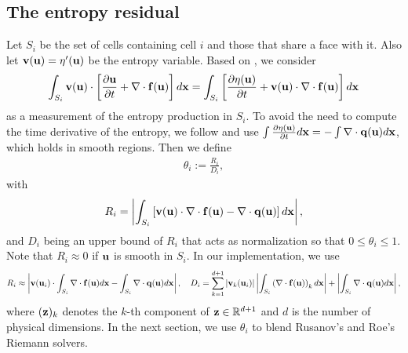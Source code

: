 \documentclass[preprint, 11pt]{article}
\newcommand{\bff}{{\bf f}}
\newcommand{\bfu}{{\bf u}}
\newcommand{\bfv}{{\bf v}}
\newcommand{\bfq}{{\bf q}}
\newcommand{\bfx}{{\bf x}}
\begin{document}
\subsection{The entropy residual}
Let $S_i$ be the set of cells containing cell $i$ and those that share a face with it.
Also let $\bfv(\bfu)=\eta^\prime(\bfu)$ be the entropy variable.
Based on \cite{guermond2011entropy}, we consider
\begin{align}\label{ent_residual}
  \int_{S_i} \bfv(\bfu) \cdot \left[ \frac{\partial \bfu}{\partial t} + \nabla\cdot \bff(\bfu)\right]d\bfx
  =\int_{S_i} \left[\frac{\partial \eta(\bfu)}{\partial t} + \bfv(\bfu) \cdot \nabla\cdot \bff(\bfu)\right] d\bfx
\end{align}
as a measurement of the entropy production in $S_i$.
To avoid the need to compute the time derivative of the entropy, we follow
\cite{guermond2018second, guermond2018well} and use
$\int \frac{\partial\eta(\bfu)}{\partial t}d\bfx=-\int \nabla\cdot\bfq(\bfu) d\bfx$,
which holds in smooth regions. Then we define
\begin{align}\label{Ri}
  \theta_i := \frac{R_i}{D_i},
\end{align}
with
\begin{align*}
  R_i=
  \left|\int_{S_i} \left[\bfv(\bfu) \cdot \nabla\cdot \bff(\bfu) - \nabla\cdot\bfq(\bfu) \right] d\bfx\right|,
\end{align*}
and $D_i$ being an upper bound of $R_i$ that acts as normalization so that $0\leq \theta_i\leq 1$.
Note that $R_i\approx 0$ if $\bfu$ is smooth in $S_i$.
In our implementation, we use
\begin{align*}
  R_i\approx \left|\bfv(\bfu_i)\cdot \int_{S_i}\nabla\cdot \bff(\bfu)d\bfx
  -\int_{S_i}\nabla\cdot\bfq(\bfu) d\bfx\right|,
  \quad
  D_i = \sum_{k=1}^{d+1}|\bfv_k(\bfu_i)|\left|\int_{S_i}\left(\nabla\cdot\bff(\bfu)\right)_kd\bfx\right|
  +\left|\int_{S_i}\nabla\cdot\bfq(\bfu)d\bfx\right|,
\end{align*}
where $({\bf z})_k$ denotes the $k$-th component of ${\bf z}\in\mathbb{R}^{d+1}$ and $d$ is the number of physical
dimensions. In the next section, we use $\theta_i$ to blend Rusanov's and Roe's Riemann solvers.
\end{document}
